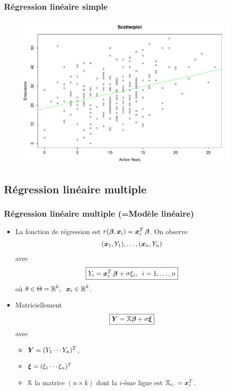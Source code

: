 \begin{frame}
\frametitle{Régression linéaire simple}
\begin{figure}[h]
\begin{center}
\includegraphics[width=0.9\textheight]{ScatterPlotEnduranceActiveYears}
\end{center}
\end{figure}
\end{frame}


\subsection{Régression linéaire multiple}

\begin{frame}
\frametitle{Régression linéaire multiple (=Modèle linéaire)}
\begin{itemize}
\item La fonction de régression est $r(\boldsymbol{\beta},\operatorname{\boldsymbol{x}}_i) = \operatorname{\boldsymbol{x}}_i^T \boldsymbol{\beta}$.
On observe
$$(\operatorname{\boldsymbol{x}}_1,Y_1),\ldots, (\operatorname{\boldsymbol{x}}_n,Y_n)$$
avec
$$\boxed{Y_i = \operatorname{\boldsymbol{x}}_i^T \boldsymbol{\beta}+ \sigma \xi_i,\;\;i=1,\ldots, n}$$
où $\theta \in \Theta = \operatorname{{\mathbb R}}^k,\;\;\operatorname{\boldsymbol{x}}_i \in \operatorname{{\mathbb R}}^k$.
\item \alert{Matriciellement}
$$\boxed{\operatorname{\boldsymbol{Y}} = \mathbb{X}\boldsymbol{\beta} + \sigma \boldsymbol{\xi}}$$
avec 
\begin{itemize}
\item \alert<1>{$\operatorname{\boldsymbol{Y}} = (Y_1 \cdots Y_n)^T$}, 
\item \alert<2>{$\boldsymbol{\xi} = (\xi_1 \cdots \xi_n)^T$} 
\item \alert<3>{$\mathbb{X}$ la matrice $(n\times k)$
dont la $i$-ème ligne est $\mathbb{X}_{i,\cdot}= \operatorname{\boldsymbol{x}}_i^T$.}
\end{itemize}
\end{itemize}
\end{frame}





